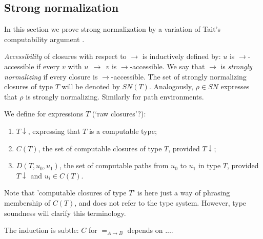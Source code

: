 \documentclass[10pt,a4paper]{article}
\newcommand{\red}{~~{\to}~~}
\newcommand{\SN}{\mathit{SN}}
\newcommand{\Ctp}[1]{{#1{\downarrow}}}
\begin{document}
\subsection{Strong normalization}\label{sec:SN}
In this section we prove strong normalization by a variation of Tait's
computability argument \cite{xx}. 

\begin{definition}\label{accessible}
\emph{Accessibility} of closures with respect to $\to$ is inductively defined
by: $u$ is $\to$-accessible if every $v$ with $u\red v$ is $\to$-accessible.
We say that $\to$ is \emph{strongly normalizing} if every closure is $\to$-accessible.
The set of strongly normalizing closures of type $T$ will be denoted by $SN(T)$.
Analogously, $\rho\in\SN$ expresses that $\rho$ is strongly normalizing.
Similarly for path environments. 
\end{definition}

We define for expressions $T$ (`raw closures'?):
\begin{enumerate}
\item $\Ctp{T}$, expressing that $T$ is a computable type;
\item $C(T)$, the set of computable closures of type $T$, provided $\Ctp{T}$;
\item $D(T,u_0,u_1)$, the set of computable paths from $u_0$ to $u_1$ in type $T$, provided $\Ctp{T}$
and $u_i \in C(T)$.
\end{enumerate}
Note that 'computable closures of type $T$' is here just a way of phrasing membership of $C(T)$,
and does not refer to the type system. However, type soundness will clarify this terminology.

The induction is subtle: $C$ for $=_{A{\to}B}$ depends on ....
\end{document}
